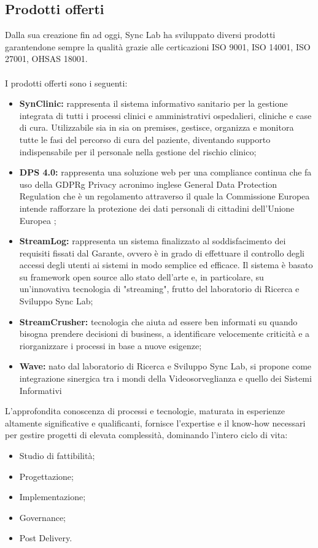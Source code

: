 \subsection{Prodotti offerti}
Dalla sua creazione fin ad oggi, Sync Lab ha sviluppato diversi prodotti
garantendone sempre la qualità grazie alle certicazioni ISO 9001, ISO 14001, ISO 27001, OHSAS 18001.\\\\
I prodotti offerti sono i seguenti:
\begin{itemize}
	\item{\textbf{SynClinic: }rappresenta il sistema informativo sanitario per la gestione integrata di tutti i processi clinici e amministrativi ospedalieri, cliniche e case di cura. Utilizzabile sia in sia on premises, gestisce, organizza e monitora tutte le fasi del percorso di cura del paziente, diventando supporto indispensabile per il personale
nella gestione del rischio clinico;}
	\item{\textbf{DPS 4.0: }rappresenta una soluzione web per una compliance continua che fa uso della GDPRg Privacy acronimo inglese General Data Protection Regulation che è un regolamento attraverso il quale la Commissione Europea intende rafforzare la protezione dei dati personali di cittadini dell’Unione Europea ;}
	\item{\textbf{StreamLog: }rappresenta un sistema finalizzato al soddisfacimento dei requisiti fissati dal Garante, ovvero è in grado di effettuare il controllo degli accessi degli utenti ai sistemi in modo semplice ed efficace. Il sistema è basato su framework open source allo stato dell’arte e, in particolare, su un’innovativa tecnologia di
"streaming", frutto del laboratorio di Ricerca e Sviluppo Sync Lab;}
	\item{\textbf{StreamCrusher: }tecnologia che aiuta ad essere ben informati su quando bisogna prendere decisioni di business, a identificare velocemente criticità e a riorganizzare
i processi in base a nuove esigenze;}
	\item{\textbf{Wave: }nato dal laboratorio di Ricerca e Sviluppo Sync Lab, si propone come integrazione sinergica tra i mondi della Videosorveglianza e quello dei Sistemi Informativi}
\end{itemize} L’approfondita conoscenza di processi e tecnologie, maturata in esperienze altamente
significative e qualificanti, fornisce l’expertise e il know-how necessari per gestire progetti di
elevata complessità, dominando l’intero ciclo di vita:
\begin{itemize}
	\item{Studio di fattibilità;}
	\item{Progettazione;}
	\item{Implementazione;}
	\item{Governance;}
	\item{Post Delivery.}
\end{itemize}

